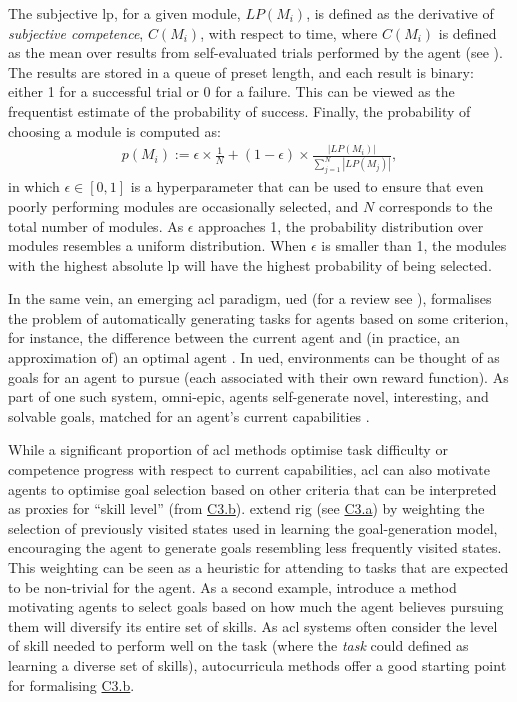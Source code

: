 \documentclass[10pt,letterpaper]{article}
\begin{document}
The subjective \gls{lp}, for a given module, $LP(M_i)$, is defined as the derivative of \emph{subjective competence}, $C(M_i)$, with respect to time, where $C(M_i)$ is defined as the mean over results from self-evaluated trials performed by the agent (see \citealp[p.~4]{colas2019curious}). The results are stored in a queue of preset length, and each result is binary: either 1 for a successful trial or 0 for a failure. This can be viewed as the frequentist estimate of the probability of success. Finally, the probability of choosing a module is computed as:
\begin{align}\label{eq:curiouslpprob}
p(M_i) := \epsilon \times \frac{1}{N} + (1-\epsilon) \times \frac{|LP(M_{i})|}{\sum_{j=1}^N |LP(M_{j})|},
\end{align}
in which $\epsilon \in [0,1]$ is a hyperparameter that can be used to ensure that even poorly performing modules are occasionally selected, and $N$ corresponds to the total number of modules. As $\epsilon$ approaches 1, the probability distribution over modules resembles a uniform distribution. When $\epsilon$ is smaller than 1, the modules with the highest absolute \gls{lp} will have the highest probability of being selected. %

In the same vein, an emerging \gls{acl} paradigm, \gls{ued} (for a review see \citealp{rutherford2024no}), formalises the problem of automatically generating tasks for agents based on some criterion, for instance, the difference between the current agent and (in practice, an approximation of) an optimal agent \citep[p.~1]{rutherford2024no}. In \gls{ued}, environments can be thought of as goals for an agent to pursue (each associated with their own reward function). As part of one such system, \gls{omni-epic}, agents self-generate novel, interesting, and solvable goals, matched for an agent's current capabilities \citep[p.~2]{faldor2024omni-epic}.

While a significant proportion of \gls{acl} methods optimise task difficulty or competence progress with respect to current capabilities, \gls{acl} can also motivate agents to optimise goal selection based on other criteria that can be interpreted as proxies for ``skill level'' (from \hyperref[sec:c3b]{C3.b}). \citet{pong2020skew-fit} extend \gls{rig} (see \hyperref[sec:c3a]{C3.a}) by weighting the selection of previously visited states used in learning the goal-generation model, encouraging the agent to generate goals resembling less frequently visited states. This weighting can be seen as a heuristic for attending to tasks that are expected to be non-trivial for the agent. As a second example, \citet{lintunen2024diversity} introduce a method motivating agents to select goals based on how much the agent believes pursuing them will diversify its entire set of skills. As \gls{acl} systems often consider the level of skill needed to perform well on the task (where the \emph{task} could defined as learning a diverse set of skills), autocurricula methods offer a good starting point for formalising \hyperref[sec:c3b]{C3.b}.
\end{document}
